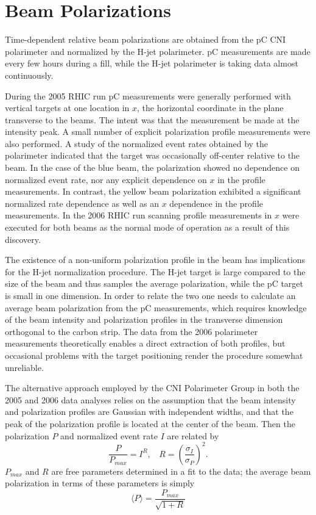 \section{Beam Polarizations}

Time-dependent relative beam polarizations are obtained from the pC CNI
polarimeter and normalized by the H-jet polarimeter. pC measurements are made
every few hours during a fill, while the H-jet polarimeter is taking data
almost continuously.

During the 2005 RHIC run pC measurements were generally performed with
vertical targets at one location in \(x\), the horizontal coordinate in the
plane transverse to the beams. The intent was that the measurement be made at
the intensity peak. A small number of explicit polarization profile
measurements were also performed. A study of the normalized event rates
obtained by the polarimeter indicated that the target was occasionally
off-center relative to the beam. In the case of the blue beam, the
polarization showed no dependence on normalized event rate, nor any explicit
dependence on \(x\) in the profile measurements. In contrast, the yellow beam
polarization exhibited a significant normalized rate dependence as well as an
\(x\) dependence in the profile measurements. In the 2006 RHIC run scanning
profile measurements in \(x\) were executed for both beams as the normal mode
of operation as a result of this discovery.

The existence of a non-uniform polarization profile in the beam has
implications for the H-jet normalization procedure. The H-jet target is large
compared to the size of the beam and thus samples the average polarization,
while the pC target is small in one dimension. In order to relate the two one
needs to calculate an average beam polarization from the pC measurements,
which requires knowledge of the beam intensity and polarization profiles in
the transverse dimension orthogonal to the carbon strip. The data from the
2006 polarimeter measurements theoretically enables a direct extraction of
both profiles, but occasional problems with the target positioning render the
procedure somewhat unreliable.

The alternative approach employed by the CNI Polarimeter Group in both the
2005 and 2006 data analyses relies on the assumption that the beam intensity
and polarization profiles are Gaussian with independent widths, and that the
peak of the polarization profile is located at the center of the beam. Then
the polarization \(P\) and normalized event rate \(I\) are related by
%
\begin{equation}
  \frac{P}{P_{max}} = I^R, ~~~~ R=\left(\frac{\sigma_I}{\sigma_P}\right)^2.
  \label{eqn:polarization}
\end{equation}
%
\(P_{max}\) and \(R\) are free parameters determined in a fit to the data; the
average beam polarization in terms of these parameters is simply
%
\begin{equation}
  \langle P \rangle = \frac{P_{max}}{\sqrt{1+R}}
\end{equation}

